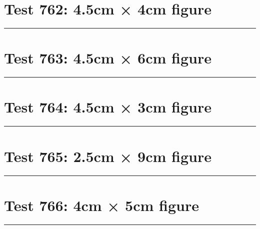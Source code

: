 \documentclass[a4paper,11pt]{article}
\begin{document}
\section*{Test 762: 4.5cm × 4cm figure}
\begin{swarmwrap}%
  \begin{minipage}[t]{4cm}
    \centering
    \rule{\linewidth}{4cm}
  \end{minipage}%
\end{swarmwrap}%
\swarmwrapnext
\lipsum[103]
\lipsum[104]
\lipsum[105]
\section*{Test 763: 4.5cm × 6cm figure}
\begin{swarmwrap}%
  \begin{minipage}[t]{4cm}
    \centering
    \rule{\linewidth}{6cm}
  \end{minipage}%
\end{swarmwrap}%
\swarmwrapnext
\lipsum[111]
\lipsum[112]
\lipsum[113]
\lipsum[114]
\section*{Test 764: 4.5cm × 3cm figure}
\begin{swarmwrap}%
  \begin{minipage}[t]{4cm}
    \centering
    \rule{\linewidth}{3cm}
  \end{minipage}%
\end{swarmwrap}%
\swarmwrapnext
\lipsum[2]
\lipsum[3]
\lipsum[4]
\section*{Test 765: 2.5cm × 9cm figure}
\begin{swarmwrap}%
  \begin{minipage}[t]{2cm}
    \centering
    \rule{\linewidth}{9cm}
  \end{minipage}%
\end{swarmwrap}%
\swarmwrapnext
\lipsum[35]
\lipsum[36]
\lipsum[37]
\section*{Test 766: 4cm × 5cm figure}
\begin{swarmwrap}%
  \begin{minipage}[t]{4cm}
    \centering
    \rule{\linewidth}{5cm}
  \end{minipage}%
\end{swarmwrap}%
\swarmwrapnext
\lipsum[4]
\lipsum[5]
\lipsum[6]
\lipsum[7]
\lipsum[8]
\lipsum[9]
\end{document}
